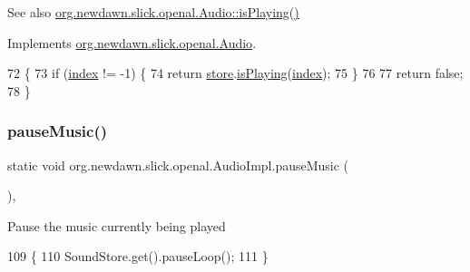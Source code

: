 \begin{DoxySeeAlso}{See also}
\mbox{\hyperlink{interfaceorg_1_1newdawn_1_1slick_1_1openal_1_1_audio_a842b49128a58be8c4473cbcc8ee4ad9e}{org.\+newdawn.\+slick.\+openal.\+Audio\+::is\+Playing()}} 
\end{DoxySeeAlso}


Implements \mbox{\hyperlink{interfaceorg_1_1newdawn_1_1slick_1_1openal_1_1_audio_a842b49128a58be8c4473cbcc8ee4ad9e}{org.\+newdawn.\+slick.\+openal.\+Audio}}.


\begin{DoxyCode}
72                                \{
73         \textcolor{keywordflow}{if} (\mbox{\hyperlink{classorg_1_1newdawn_1_1slick_1_1openal_1_1_audio_impl_ab0e80c9c431d4b6c9b667012f7f71b86}{index}} != -1) \{
74             \textcolor{keywordflow}{return} \mbox{\hyperlink{classorg_1_1newdawn_1_1slick_1_1openal_1_1_audio_impl_a1f616264ac2d6ec44cb0c187836d34f5}{store}}.\mbox{\hyperlink{classorg_1_1newdawn_1_1slick_1_1openal_1_1_sound_store_a986a26824f143a9fa9df2161b13edd44}{isPlaying}}(\mbox{\hyperlink{classorg_1_1newdawn_1_1slick_1_1openal_1_1_audio_impl_ab0e80c9c431d4b6c9b667012f7f71b86}{index}});
75         \}
76         
77         \textcolor{keywordflow}{return} \textcolor{keyword}{false};
78     \}
\end{DoxyCode}
\mbox{\label{classorg_1_1newdawn_1_1slick_1_1openal_1_1_audio_impl_a6e79580e117e61f579534c9b3fd5be4d}} 
\subsubsection{\texorpdfstring{pause\+Music()}{pauseMusic()}}
{\footnotesize\ttfamily static void org.\+newdawn.\+slick.\+openal.\+Audio\+Impl.\+pause\+Music (\begin{DoxyParamCaption}{ }\end{DoxyParamCaption})\hspace{0.3cm}{\ttfamily [inline]}, {\ttfamily [static]}}

Pause the music currently being played 
\begin{DoxyCode}
109                                     \{
110         SoundStore.get().pauseLoop();
111     \}
\end{DoxyCode}
\mbox{\label{classorg_1_1newdawn_1_1slick_1_1openal_1_1_audio_impl_ac8b7973bc209b0a2ecfc169b1d9eaae4}} 
